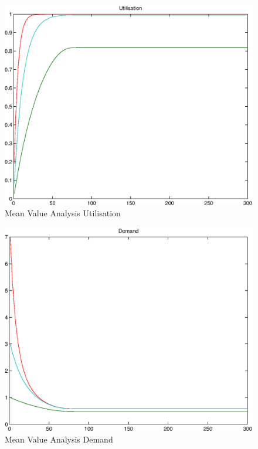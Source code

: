 \documentclass[a4paper]{article}
\begin{document}
\begin{figure}[H]
	\begin{center}
    \includegraphics[scale=0.6]{../plots-ms2-mg/mva-utilisation.eps}
  \end{center}
  \caption{Mean Value Analysis Utilisation}
  \label{fig:mva-utilisation}
\end{figure}




\begin{figure}[H]
	\begin{center}
    \includegraphics[scale=0.6]{../plots-ms2-mg/mva-demand.eps}
  \end{center}
  \caption{Mean Value Analysis Demand}
  \label{fig:mva-demand}
\end{figure}
\end{document}
